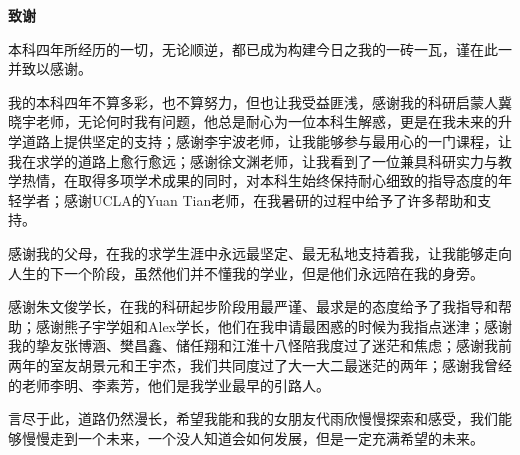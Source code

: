\setcounter{page}{5}
\begin{center}
    \vspace{0.5ex}
    \bfseries 致谢
    \vspace{0.5ex}
\end{center}


本科四年所经历的一切，无论顺逆，都已成为构建今日之我的一砖一瓦，谨在此一并致以感谢。

我的本科四年不算多彩，也不算努力，但也让我受益匪浅，感谢我的科研启蒙人冀晓宇老师，无论何时我有问题，他总是耐心为一位本科生解惑，更是在我未来的升学道路上提供坚定的支持；感谢李宇波老师，让我能够参与最用心的一门课程，让我在求学的道路上愈行愈远；感谢徐文渊老师，让我看到了一位兼具科研实力与教学热情，在取得多项学术成果的同时，对本科生始终保持耐心细致的指导态度的年轻学者；感谢UCLA的Yuan Tian老师，在我暑研的过程中给予了许多帮助和支持。

感谢我的父母，在我的求学生涯中永远最坚定、最无私地支持着我，让我能够走向人生的下一个阶段，虽然他们并不懂我的学业，但是他们永远陪在我的身旁。

感谢朱文俊学长，在我的科研起步阶段用最严谨、最求是的态度给予了我指导和帮助；感谢熊子宇学姐和Alex学长，他们在我申请最困惑的时候为我指点迷津；感谢我的挚友张博涵、樊昌鑫、储任翔和江淮十八怪陪我度过了迷茫和焦虑；感谢我前两年的室友胡景元和王宇杰，我们共同度过了大一大二最迷茫的两年；感谢我曾经的老师李明、李素芳，他们是我学业最早的引路人。

言尽于此，道路仍然漫长，希望我能和我的女朋友代雨欣慢慢探索和感受，我们能够慢慢走到一个未来，一个没人知道会如何发展，但是一定充满希望的未来。